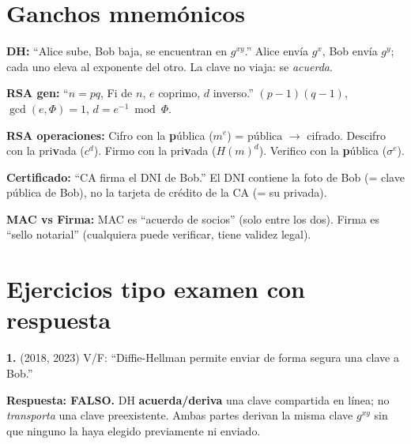 \documentclass[11pt,a4paper]{article}
\begin{document}
\section{Ganchos mnemónicos}

\begin{tcolorbox}[
  enhanced, breakable,
  colback=warnorange!6, colframe=warnorange,
  leftrule=5pt, toprule=0pt, bottomrule=0pt, rightrule=0pt,
  arc=0pt, left=8pt, right=6pt, top=6pt, bottom=6pt,
  fonttitle=\bfseries\small\color{warnorange},
  title={Ganchos mnemónicos -- Examen}
]
\textbf{DH:} ``Alice sube, Bob baja, se encuentran en $g^{xy}$.'' Alice envía
$g^x$, Bob envía $g^y$; cada uno eleva al exponente del otro. La clave no viaja:
se \emph{acuerda}.

\medskip
\textbf{RSA gen:} ``$n=pq$, Fi de $n$, $e$ coprimo, $d$ inverso.'' $(p-1)(q-1)$,
$\gcd(e,\Phi)=1$, $d=e^{-1}\bmod\Phi$.

\medskip
\textbf{RSA operaciones:} Cifro con la \textbf{p}ública ($m^e$) = pública $\to$
cifrado. Descifro con la pri\textbf{v}ada ($c^d$). Firmo con la pri\textbf{v}ada
($H(m)^d$). Verifico con la \textbf{p}ública ($\sigma^e$).

\medskip
\textbf{Certificado:} ``CA firma el DNI de Bob.'' El DNI contiene la foto de Bob
(= clave pública de Bob), no la tarjeta de crédito de la CA (= su privada).

\medskip
\textbf{MAC vs Firma:} MAC es ``acuerdo de socios'' (solo entre los dos).
Firma es ``sello notarial'' (cualquiera puede verificar, tiene validez legal).
\end{tcolorbox}

\section{Ejercicios tipo examen con respuesta}

\begin{examen}
\textbf{1.} (2018, 2023) V/F: ``Diffie-Hellman permite enviar de forma segura una
clave a Bob.''

\textbf{Respuesta: FALSO.} DH \textbf{acuerda/deriva} una clave compartida en
línea; no \emph{transporta} una clave preexistente. Ambas partes derivan la misma
clave $g^{xy}$ sin que ninguno la haya elegido previamente ni enviado.
\end{examen}
\end{document}
